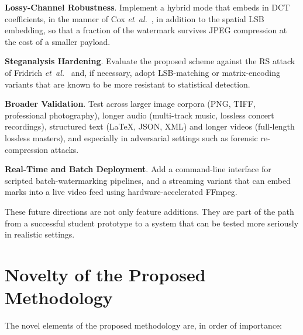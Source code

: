 \textbf{Lossy-Channel Robustness}. Implement a hybrid mode that embeds in DCT coefficients, in the manner of Cox \emph{et~al.}~\cite{cox1997secure}, in addition to the spatial LSB embedding, so that a fraction of the watermark survives JPEG compression at the cost of a smaller payload.

\textbf{Steganalysis Hardening}. Evaluate the proposed scheme against the RS attack of Fridrich \emph{et~al.}~\cite{fridrich2001detecting} and, if necessary, adopt LSB-matching or matrix-encoding variants that are known to be more resistant to statistical detection.

\textbf{Broader Validation}. Test across larger image corpora (PNG, TIFF, professional photography), longer audio (multi-track music, lossless concert recordings), structured text (LaTeX, JSON, XML) and longer videos (full-length lossless masters), and especially in adversarial settings such as forensic re-compression attacks.

\textbf{Real-Time and Batch Deployment}. Add a command-line interface for scripted batch-watermarking pipelines, and a streaming variant that can embed marks into a live video feed using hardware-accelerated FFmpeg.

These future directions are not only feature additions. They are part of the path from a successful student prototype to a system that can be tested more seriously in realistic settings.

\section{Novelty of the Proposed Methodology}
\label{sec:novelty}

The novel elements of the proposed methodology are, in order of importance:

